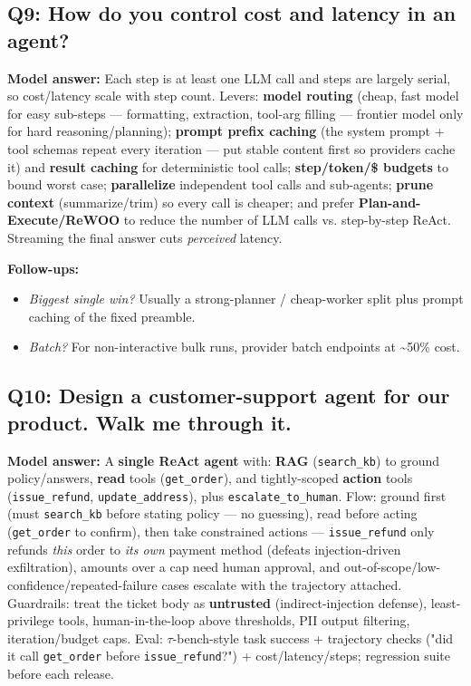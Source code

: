 \documentclass[11pt]{article}
\providecommand{\tightlist}{\setlength{\itemsep}{1pt}\setlength{\parskip}{0pt}}
\begin{document}
\subsection{Q9: How do you control cost and latency in an agent?}\label{q9-how-do-you-control-cost-and-latency-in-an-agent}

\textbf{Model answer:} Each step is at least one LLM call and steps are largely serial, so cost/latency scale with step count. Levers: \textbf{model routing} (cheap, fast model for easy sub-steps --- formatting, extraction, tool-arg filling --- frontier model only for hard reasoning/planning); \textbf{prompt prefix caching} (the system prompt + tool schemas repeat every iteration --- put stable content first so providers cache it) and \textbf{result caching} for deterministic tool calls; \textbf{step/token/\$ budgets} to bound worst case; \textbf{parallelize} independent tool calls and sub-agents; \textbf{prune context} (summarize/trim) so every call is cheaper; and prefer \textbf{Plan-and-Execute/ReWOO} to reduce the number of LLM calls vs. step-by-step ReAct. Streaming the final answer cuts \emph{perceived} latency.

\textbf{Follow-ups:}

\begin{itemize}
\tightlist
\item
  \emph{Biggest single win?} Usually a strong-planner / cheap-worker split plus prompt caching of the fixed preamble.
\item
  \emph{Batch?} For non-interactive bulk runs, provider batch endpoints at \textasciitilde50\% cost.
\end{itemize}

\subsection{Q10: Design a customer-support agent for our product. Walk me through it.}\label{q10-design-a-customer-support-agent-for-our-product-walk-me-through-it}

\textbf{Model answer:} A \textbf{single ReAct agent} with: \textbf{RAG} (\texttt{search\_kb}) to ground policy/answers, \textbf{read} tools (\texttt{get\_order}), and tightly-scoped \textbf{action} tools (\texttt{issue\_refund}, \texttt{update\_address}), plus \texttt{escalate\_to\_human}. Flow: ground first (must \texttt{search\_kb} before stating policy --- no guessing), read before acting (\texttt{get\_order} to confirm), then take constrained actions --- \texttt{issue\_refund} only refunds \emph{this} order to \emph{its own} payment method (defeats injection-driven exfiltration), amounts over a cap need human approval, and out-of-scope/low-confidence/repeated-failure cases escalate with the trajectory attached. Guardrails: treat the ticket body as \textbf{untrusted} (indirect-injection defense), least-privilege tools, human-in-the-loop above thresholds, PII output filtering, iteration/budget caps. Eval: \(\tau\)-bench-style task success + trajectory checks ("did it call \texttt{get\_order} before \texttt{issue\_refund}?") + cost/latency/steps; regression suite before each release.
\end{document}
